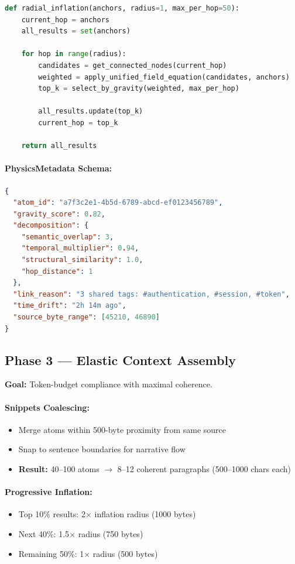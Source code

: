 \documentclass[11pt]{article}
\begin{document}
\begin{lstlisting}[language=Python, caption={Radial Inflation Algorithm}]
def radial_inflation(anchors, radius=1, max_per_hop=50):
    current_hop = anchors
    all_results = set(anchors)
    
    for hop in range(radius):
        candidates = get_connected_nodes(current_hop)
        weighted = apply_unified_field_equation(candidates, anchors)
        top_k = select_by_gravity(weighted, max_per_hop)
        
        all_results.update(top_k)
        current_hop = top_k
    
    return all_results
\end{lstlisting}

\paragraph{PhysicsMetadata Schema:}
\begin{lstlisting}[language=JSON, caption={PhysicsMetadata JSON Schema}]
{
  "atom_id": "a7f3c2e1-4b5d-6789-abcd-ef0123456789",
  "gravity_score": 0.82,
  "decomposition": {
    "semantic_overlap": 3,
    "temporal_multiplier": 0.94,
    "structural_similarity": 1.0,
    "hop_distance": 1
  },
  "link_reason": "3 shared tags: #authentication, #session, #token",
  "time_drift": "2h 14m ago",
  "source_byte_range": [45210, 46890]
}
\end{lstlisting}

\subsection{Phase 3 --- Elastic Context Assembly}

\textbf{Goal:} Token-budget compliance with maximal coherence.

\paragraph{Snippets Coalescing:}
\begin{itemize}
    \item Merge atoms within 500-byte proximity from same source
    \item Snap to sentence boundaries for narrative flow
    \item \textbf{Result:} 40--100 atoms $\to$ 8--12 coherent paragraphs (500--1000 chars each)
\end{itemize}

\paragraph{Progressive Inflation:}
\begin{itemize}
    \item Top 10\% results: 2$\times$ inflation radius (1000 bytes)
    \item Next 40\%: 1.5$\times$ radius (750 bytes)
    \item Remaining 50\%: 1$\times$ radius (500 bytes)
\end{itemize}
\end{document}
